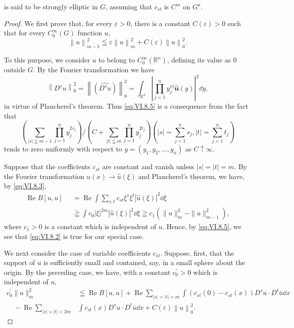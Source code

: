 is said to be strongly elliptic in $G$, assuming that $c_{st}$ is $C^m$ on $G^a$. 

\begin{proof}
 We first prove that, for every $\varepsilon > 0$, there is a constant $C(\varepsilon) > 0$ such that for every $C_0^\infty(G)$ function $u$, 
\begin{equation}\label{eq:VI.8.5}
\left\| u \right\| _{m-1} ^{2} \leqq \varepsilon \left\| u \right\| _{m} ^{2} + C (\varepsilon) \left\| u \right\| _{0} ^{2}. \end{equation}

To this purpose, we consider $u$ to belong to $C_0^\infty (\mathbb{R}^{n})$, defining its value as $0$ outside $G$. By the Fourier transformation we have 
\[
\left\| D ^{s} u \right\| _{0} ^{2} = \left\| (\widehat {D ^{s} u}) \right\| _{0} ^{2} = \int_ {\mathbb{R}^{n}} \left| \prod\limits_{j=1} ^{n} y _{j} ^{sj} \hat {\boldsymbol {u}} (y) \right| ^{2} \dd y,
\]
in virtue of Plancherel's theorem. Thus \eqref{eq:VI.8.5} is a consequence from the fact that 
\[
\left(\sum\limits_{| s | \leqq m -1} \prod\limits_{j=1} ^{n} y _{j} ^ {2 s _{j}}\right) / \left(C + \sum\limits_{| t | \leqq m} \prod\limits_{j=1} ^{n} y _{j} ^ {2 t _{j}}\right) \left(| s | = \sum\limits_{j=1} ^{n} s _{j}, | t | = \sum\limits_{j=1} ^{n} t _{j}\right)
\]
tends to zero uniformly with respect to $y = (y_{1}, y_{2}, \ldots, y_{n})$ as $C \uparrow \infty$. 

Suppose that the coefficients $c_{st}$ are constant and vanish unless $|s| = |t| = m$. By the Fourier transformation $u(x) \to \hat{u}(\xi)$ and Plancherel's theorem, we have, by \eqref{eq:VI.8.3}, 
\[
\begin{aligned}
\operatorname{Re} B [ u, u ]& = \operatorname{Re} \int \sum\limits_{s,t} c _{st} \xi^{s} \xi^{t} | \hat {u} (\xi) | ^{2} \dd \xi
\\
\qquad \qquad \qquad& \geqq \int c _{0} | \xi | ^{2m} | \hat {u} (\xi) | ^{2} \dd \xi \geqq c _{1} (\| u \| _{m} ^{2} - \| u \| _{m-1} ^{2}),
\end{aligned}
\]
where $c_{1} > 0$ is a constant which is independent of $u$. Hence, by \eqref{eq:VI.8.5}, we see that \eqref{eq:VI.8.2} is true for our special case. 

We next consider the case of variable coefficients $c_{st}$. Suppose, first, that the support of $u$ is sufficiently small and contained, say, in a small sphere about the origin. By the preceding case, we have, with a constant $c_{0}^{\prime}>0$ which is independent of $u$, 
\[
\begin{aligned}
c _{0} ^{\prime} \| u \| _{m} ^{2}& \leqq \operatorname{Re} B [ u, u ] + \operatorname{Re} \sum\limits_{|s|=|t|=m} \int (c _{st} (0) - c _{st} (x)) D ^{s} u \cdot D ^{t} \bar {u} \dd x
\\
\quad - \operatorname{Re} \sum\limits_{|s|+|t|<2m}& \int c _{st} (x) D ^{s} u \cdot D ^{t} \bar {u} \dd x + C (\varepsilon) \left\| u \right\| _{0} ^{2}.
\end{aligned}
\]


\end{proof}
